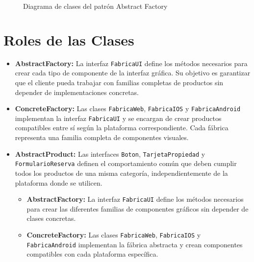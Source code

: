 \begin{figure}[H]
    \centering
    \caption{Diagrama de clases del patrón Abstract Factory}
\end{figure}


\section{Roles de las Clases}


\begin{itemize}
    \item \textbf{AbstractFactory:}  
    La interfaz \texttt{FabricaUI} define los métodos necesarios para crear
    cada tipo de componente de la interfaz gráfica. Su objetivo es garantizar
    que el cliente pueda trabajar con familias completas de productos sin
    depender de implementaciones concretas.

    \item \textbf{ConcreteFactory:}  
    Las clases \texttt{FabricaWeb}, \texttt{FabricaIOS} y
    \texttt{FabricaAndroid} implementan la interfaz \texttt{FabricaUI} y se
    encargan de crear productos compatibles entre sí según la plataforma
    correspondiente. Cada fábrica representa una familia completa de
    componentes visuales.

    \item \textbf{AbstractProduct:}  
    Las interfaces \texttt{Boton}, \texttt{TarjetaPropiedad} y
    \texttt{FormularioReserva} definen el comportamiento común que deben
    cumplir todos los productos de una misma categoría, independientemente
    de la plataforma donde se utilicen.

\begin{itemize}
    \item \textbf{AbstractFactory:}  
    La interfaz \texttt{FabricaUI} define los métodos necesarios para crear
    las diferentes familias de componentes gráficos sin depender de clases
    concretas.

    \item \textbf{ConcreteFactory:}  
    Las clases \texttt{FabricaWeb}, \texttt{FabricaIOS} y
    \texttt{FabricaAndroid} implementan la fábrica abstracta y crean
    componentes compatibles con cada plataforma específica.


\end{itemize}
\end{itemize}
